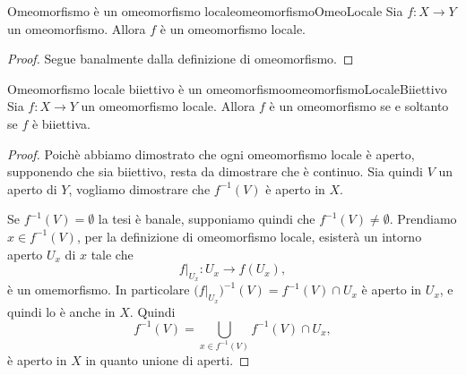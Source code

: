 \begin{prop}{Omeomorfismo è un omeomorfismo locale}{omeomorfismoOmeoLocale}
	Sia \(f\colon X\to Y\) un omeomorfismo.
	Allora \(f\) è un omeomorfismo locale.
\end{prop}

\begin{proof}
	Segue banalmente dalla definizione di omeomorfismo.
\end{proof}

\begin{prop}{Omeomorfismo locale biiettivo è un omeomorfismo}{omeomorfismoLocaleBiiettivo}
	Sia \(f\colon X\to Y\) un omeomorfismo locale.
	Allora \(f\) è un omeomorfismo se e soltanto se \(f\) è biiettiva.
\end{prop}

\begin{proof}
	Poichè abbiamo dimostrato che ogni omeomorfismo locale è aperto, supponendo che sia biiettivo, resta da dimostrare che è continuo.
	Sia quindi \(V\) un aperto di \(Y\), vogliamo dimostrare che \(f^{-1}(V)\) è aperto in \(X\).

	Se \(f^{-1}(V)=\emptyset\) la tesi è banale, supponiamo quindi che \(f^{-1}(V)\neq \emptyset\).
	Prendiamo \(x\in f^{-1}(V)\), per la definizione di omeomorfismo locale, esisterà un intorno aperto \(U_x\) di \(x\) tale che
	\[
		f|_{U_x}\colon U_x \to f(U_x),
	\]
	è un omemorfismo.
	In particolare \(\big(f|_{U_x}\big)^{-1}(V)=f^{-1}(V)\cap U_x\) è aperto in \(U_x\), e quindi lo è anche in \(X\).
	Quindi
	\[
		f^{-1}(V) = \bigcup_{x\in f^{-1}(V)} f^{-1}(V)\cap U_x,
	\]
	è aperto in \(X\) in quanto unione di aperti.
\end{proof}